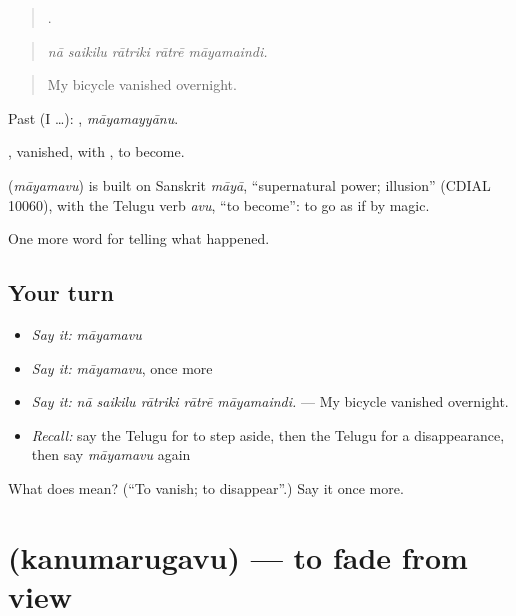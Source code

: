 \begin{quote}
    .
\end{quote}

\begin{quote}
\emph{nā saikilu rātriki rātrē māyamaindi.}
\end{quote}

\begin{quote}
My bicycle vanished overnight.
\end{quote}

Past (I …): , \emph{māyamayyānu}.

, vanished, with , to become.

\begin{cousinweb}
\textbf{} (\emph{māyamavu}) is built on Sanskrit \emph{māyā}, \textquotedblleft{}supernatural power; illusion\textquotedblright{} (CDIAL 10060), with the Telugu verb \emph{avu}, \textquotedblleft{}to become\textquotedblright{}: to go as if by magic.
\end{cousinweb}

\begin{grammarlens}[title={What you've built}]
One more word for telling what happened.
\end{grammarlens}

\subsection*{Your turn}
\begin{itemize}
\raggedright
  \item \emph{Say it:} \emph{māyamavu}
  \item \emph{Say it:} \emph{māyamavu}, once more
  \item \emph{Say it:} \emph{nā saikilu rātriki rātrē māyamaindi.} — My bicycle vanished overnight.
  \item \emph{Recall:} say the Telugu for to step aside, then the Telugu for a disappearance, then say \emph{māyamavu} again
\end{itemize}

\begin{tcolorbox}[breakable,colback=teal!4,colframe=teal!35!black,title={Before you move on}]
What does  mean? (\textquotedblleft{}To vanish; to disappear\textquotedblright{}.) Say it once more.
\end{tcolorbox}
\section[\texorpdfstring{\te{కనుమరుగవు} (kanumarugavu)}{కనుమరుగవు (kanumarugavu)}]{ (kanumarugavu) — to fade from view}

